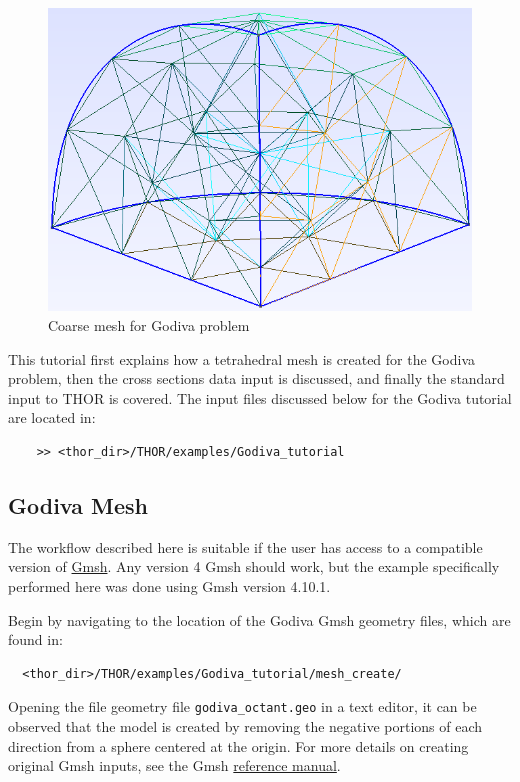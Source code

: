 \begin{figure}[th]
  \includegraphics[width=1.0\textwidth]{chapters/tutorials/figures/godiva_coarse.png}
  \caption{Coarse mesh for Godiva problem}
  \label{fig:godiva_coarse}
\end{figure}

This tutorial first explains how a tetrahedral mesh is created for the Godiva problem, then the cross sections data input is discussed, and finally the standard input to THOR is covered.
The input files discussed below for the Godiva tutorial are located in:
\begin{verbatim}
    >> <thor_dir>/THOR/examples/Godiva_tutorial
\end{verbatim}

\subsection{Godiva Mesh}\label{ch:tuts:sec:godiva:ssec:mesh}

The workflow described here is suitable if the user has access to a compatible version of \href{https://gmsh.info/}{Gmsh}.
Any version 4 Gmsh should work, but the example specifically performed here was done using Gmsh version 4.10.1.

Begin by navigating to the location of the Godiva Gmsh geometry files, which are found in:
\begin{verbatim}
  <thor_dir>/THOR/examples/Godiva_tutorial/mesh_create/
\end{verbatim}
Opening the file geometry file \verb"godiva_octant.geo" in a text editor, it can be observed that the model is created by removing the negative portions of each direction from a sphere centered at the origin.
For more details on creating original Gmsh inputs, see the Gmsh \href{https://gmsh.info/doc/texinfo/gmsh.html}{reference manual}.

